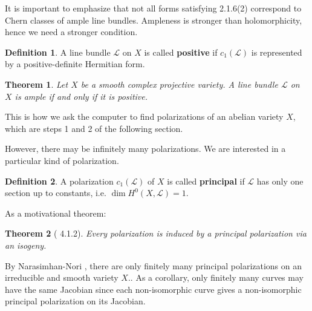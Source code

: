 \documentclass[12pt,reqno]{amsart}
\newcommand{\C}{\mathbb{C}}
\newcommand{\R}{\mathbb{R}}
\newcommand{\mc}{\mathcal}
\newtheorem*{thm*}{Theorem}
\theoremstyle{definition}
\newtheorem{defn}{Definition}
\theoremstyle{remark}
\newtheorem*{remark}{Remark}
\begin{document}
It is important to emphasize that not all forms satisfying 2.1.6(2) correspond to Chern classes of ample line bundles. Ampleness is stronger than holomorphicity, hence we need a stronger condition. 

\begin{defn} 
A line bundle $\mc{L}$ on $X$ is called \textbf{positive} if $c_1(\mc{L})$ is represented by a positive-definite Hermitian form.
\end{defn}

\begin{thm*} 
Let $X$ be a smooth complex projective variety. A line bundle $\mc{L}$ on $X$ is ample if and only if it is positive.
\end{thm*}



This is how we ask the computer to find polarizations of an abelian variety $X$, which are steps 1 and 2 of the following section.

However, there may be infinitely many polarizations. We are interested in a particular kind of polarization.

\begin{defn}  A polarization $c_1(\mc{L})$ of $X$ is called \textbf{principal} if $\mc{L}$ has only one section up to constants, i.e. $\dim H^0(X, \mc{L}) = 1$.  \end{defn} 

As a motivational theorem:

\begin{thm*} [\cite{bl} 4.1.2] Every polarization is induced by a principal polarization via an isogeny. \end{thm*}

By Narasimhan-Nori \cite{nn}, there are only finitely many principal polarizations on an irreducible and smooth variety $X.$. As a corollary, only finitely many curves may have the same Jacobian since each non-isomorphic curve gives a non-isomorphic principal polarization on its Jacobian.
\end{document}

